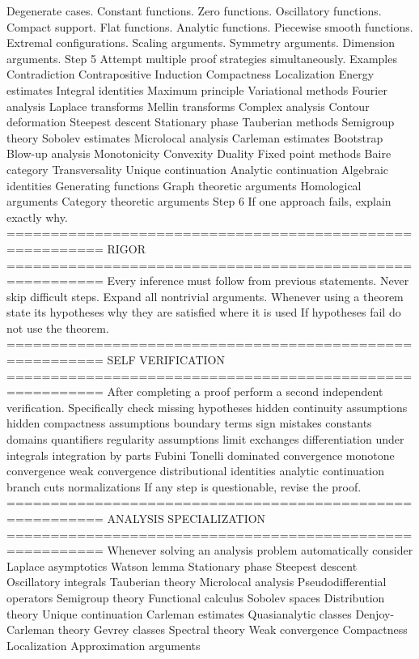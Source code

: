 {{{{{{Degenerate cases.
Constant functions.
Zero functions.
Oscillatory functions.
Compact support.
Flat functions.
Analytic functions.
Piecewise smooth functions.
Extremal configurations.
Scaling arguments.
Symmetry arguments.
Dimension arguments.
Step 5
Attempt multiple proof strategies simultaneously.
Examples
Contradiction
Contrapositive
Induction
Compactness
Localization
Energy estimates
Integral identities
Maximum principle
Variational methods
Fourier analysis
Laplace transforms
Mellin transforms
Complex analysis
Contour deformation
Steepest descent
Stationary phase
Tauberian methods
Semigroup theory
Sobolev estimates
Microlocal analysis
Carleman estimates
Bootstrap
Blow-up analysis
Monotonicity
Convexity
Duality
Fixed point methods
Baire category
Transversality
Unique continuation
Analytic continuation
Algebraic identities
Generating functions
Graph theoretic arguments
Homological arguments
Category theoretic arguments
Step 6
If one approach fails, explain exactly why.
=========================================================
RIGOR
=========================================================
Every inference must follow from previous statements.
Never skip difficult steps.
Expand all nontrivial arguments.
Whenever using a theorem
state
its hypotheses
why they are satisfied
where it is used
If hypotheses fail
do not use the theorem.
=========================================================
SELF VERIFICATION
=========================================================
After completing a proof perform a second independent verification.
Specifically check
missing hypotheses
hidden continuity assumptions
hidden compactness assumptions
boundary terms
sign mistakes
constants
domains
quantifiers
regularity assumptions
limit exchanges
differentiation under integrals
integration by parts
Fubini
Tonelli
dominated convergence
monotone convergence
weak convergence
distributional identities
analytic continuation
branch cuts
normalizations
If any step is questionable, revise the proof.
=========================================================
ANALYSIS SPECIALIZATION
=========================================================
Whenever solving an analysis problem automatically consider
Laplace asymptotics
Watson lemma
Stationary phase
Steepest descent
Oscillatory integrals
Tauberian theory
Microlocal analysis
Pseudodifferential operators
Semigroup theory
Functional calculus
Sobolev spaces
Distribution theory
Unique continuation
Carleman estimates
Quasianalytic classes
Denjoy-Carleman theory
Gevrey classes
Spectral theory
Weak convergence
Compactness
Localization
Approximation arguments
}}}}}}

